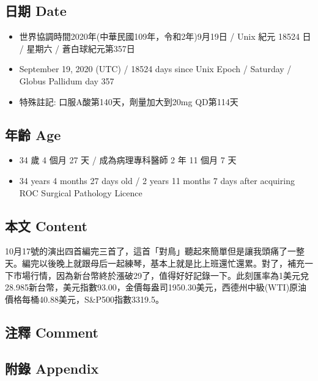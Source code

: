 \documentclass[a5paper, 11pt
]{book}
\providecommand{\tightlist}{%
  \setlength{\itemsep}{0pt}\setlength{\parskip}{0pt}}
\begin{document}
\hypertarget{ux65e5ux671f-date-18}{%
\subsection{日期 Date}\label{ux65e5ux671f-date-18}}

\begin{itemize}
\tightlist
\item
  世界協調時間2020年(中華民國109年，令和2年)9月19日 / Unix 紀元 18524 日
  / 星期六 / 蒼白球紀元第357日
\item
  September 19, 2020 (UTC) / 18524 days since Unix Epoch / Saturday /
  Globus Pallidum day 357
\item
  特殊註記: 口服A酸第140天，劑量加大到20mg QD第114天
\end{itemize}

\hypertarget{ux5e74ux9f61-age-18}{%
\subsection{年齡 Age}\label{ux5e74ux9f61-age-18}}

\begin{itemize}
\tightlist
\item
  34 歲 4 個月 27 天 / 成為病理專科醫師 2 年 11 個月 7 天
\item
  34 years 4 months 27 days old / 2 years 11 months 7 days after
  acquiring ROC Surgical Pathology Licence
\end{itemize}

\hypertarget{ux672cux6587-content-18}{%
\subsection{本文 Content}\label{ux672cux6587-content-18}}

10月17號的演出四首編完三首了，這首「對鳥」聽起來簡單但是讓我頭痛了一整天。編完以後晚上就跟母后一起練琴，基本上就是比上班還忙還累。對了，補充一下市場行情，因為新台幣終於漲破29了，值得好好記錄一下。此刻匯率為1美元兌28.985新台幣，美元指數93.00，金價每盎司1950.30美元，西德州中級(WTI)原油價格每桶40.88美元，S\&P500指數3319.5。

\hypertarget{ux6ce8ux91cb-comment-18}{%
\subsection{注釋 Comment}\label{ux6ce8ux91cb-comment-18}}

\hypertarget{ux9644ux9304-appendix-18}{%
\subsection{附錄 Appendix}\label{ux9644ux9304-appendix-18}}
\end{document}
